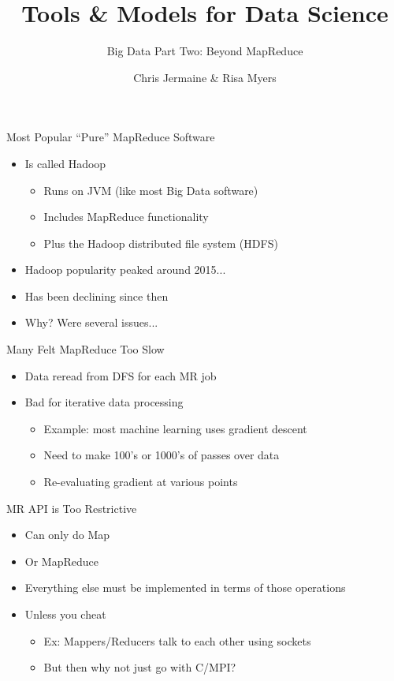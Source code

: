 \documentclass[aspectratio=169]{beamer}
\title[]
{Tools \& Models for Data Science}
\subtitle{Big Data Part Two: Beyond MapReduce}
\author[]{Chris Jermaine \& Risa Myers}
\institute
{
  Rice University 
}
\date[]{}
\begin{document}
\begin{frame}
 \titlepage
\end{frame}

\begin{frame}{Most Popular ``Pure'' MapReduce Software}

\begin{itemize}
\item Is called Hadoop
\begin{itemize}
\item Runs on JVM (like most Big Data software)
\item Includes MapReduce functionality
\item Plus the Hadoop distributed file system (HDFS)
\end{itemize}
\item Hadoop popularity peaked around 2015...
\item Has been declining since then
\item Why?  Were several issues...
\end{itemize}
\end{frame}

\begin{frame}{Many Felt MapReduce Too Slow}

\begin{itemize}
\item Data reread from DFS for each MR job
\item Bad for iterative data processing
	\begin{itemize}
	\item Example: most machine learning uses gradient descent
	\item Need to make 100's or 1000's of passes over data
	\item Re-evaluating gradient at various points
	\end{itemize}
\end{itemize}
\end{frame}

\begin{frame}{MR API is Too Restrictive}

\begin{itemize}
\item Can only do Map
\item Or MapReduce
\item Everything else must be implemented in terms of those operations
\item Unless you cheat 
	\begin{itemize}
	\item Ex: Mappers/Reducers talk to each other using sockets
	\item But then why not just go with C/MPI? %
	\end{itemize}
\end{itemize}
\end{frame}
\end{document}
